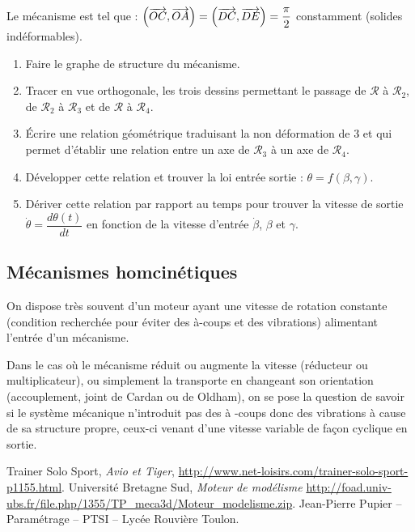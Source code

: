 \documentclass[10pt,oneside]{article}
\begin{document}
\begin{exemple}
Le mécanisme est tel que : $\left( \overrightarrow{OC},\overrightarrow{OA}\right) = \left( \overrightarrow{DC},\overrightarrow{DE}\right)=\dfrac{\pi}{2} $  constamment (solides indéformables).
\begin{enumerate}
\item Faire le graphe de structure du mécanisme.
\item Tracer en vue orthogonale, les trois dessins permettant le passage de $\mathcal{R}$ à $\mathcal{R}_2$, de $\mathcal{R}_2$  à $\mathcal{R}_3$ et de $\mathcal{R}$  à $\mathcal{R}_4$.%
\item Écrire une relation géométrique traduisant la non déformation de 3 et qui permet d'établir une relation entre un axe de $\mathcal{R}_3$  à un axe de $\mathcal{R}_4$.
\item Développer cette relation et trouver la loi entrée sortie : $\theta = f(\beta , \gamma)$. %
\item Dériver cette relation par rapport au temps pour trouver la vitesse de sortie  $\dot{\theta}=\dfrac{d\theta(t)}{dt}$ en fonction de la vitesse d'entrée $\dot{\beta}$, $\beta$ et $\gamma$.
\end{enumerate}

\end{exemple}

\subsection{Mécanismes homcinétiques}
On dispose très souvent d'un moteur ayant une vitesse de rotation constante (condition recherchée pour éviter des à-coups et des vibrations) alimentant l'entrée d'un mécanisme.

Dans le cas où le mécanisme réduit ou augmente la vitesse (réducteur ou multiplicateur), ou simplement la transporte en changeant son orientation (accouplement, joint de Cardan ou de Oldham), on se pose la question de savoir si le système mécanique n'introduit pas des à -coups donc des vibrations à cause de sa structure propre, ceux-ci venant d'une vitesse variable de façon cyclique en sortie.



\begin{thebibliography}{2}
 Trainer Solo Sport, \textit{Avio et Tiger}, \url{http://www.net-loisirs.com/trainer-solo-sport-p1155.html}.
 Université Bretagne Sud, \textit{Moteur de modélisme} \url{http://foad.univ-ubs.fr/file.php/1355/TP_meca3d/Moteur_modelisme.zip}.
 Jean-Pierre Pupier -- Paramétrage -- PTSI -- Lycée Rouvière Toulon.
\end{thebibliography}
\end{document}

